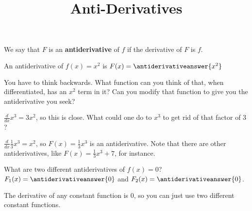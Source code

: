 \documentclass{ximera}
\title[Dig-In:]{Anti-Derivatives}
\begin{document}
	\begin{definition}
		We say that $F$ is an \textbf{antiderivative} of $f$ if the derivative of $F$ is $f$.
	\end{definition}
	
	
	\begin{question}
		An antiderivative of $f(x) = x^2$ is $F(x) = \antiderivativeanswer{x^2}$
			\begin{hint}
				You have to think backwards.  What function can you think of that, when differentiated, has an $x^2$ term in it?  Can you modify that function to give you the antiderivative you seek?
			\end{hint}
			\begin{hint}
				$\frac{d}{dx} x^3 = 3x^2$, so this is close.  What could one do to $x^3$ to get rid of that factor of $3$?
			\end{hint}
			\begin{hint}
				$\frac{d}{dx} \frac{1}{3} x^3 = x^2$, so $F(x) = \frac{1}{3} x^3$ is an antiderivative.  Note that there are other antiderivatives, like $F(x) = \frac{1}{3}x^3 + 7$, for instance.
			\end{hint}
	\end{question}
	
	\begin{question}
		
		What are two different antiderivatives of $f(x) = 0$?  $F_1(x) =  \antiderivativeanswer{0}$ and $F_2(x) = \antiderivativeanswer{0}$.
		
		\begin{hint}
			The derivative of any constant function is $0$, so you can just use two different constant functions.
		\end{hint}
	\end{question}
	
\end{document}

